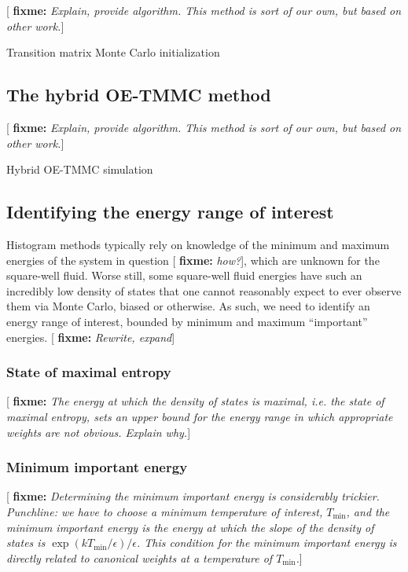 \documentclass[11pt]{article}
\renewcommand{\t}{\text} %
\newcommand{\p}[1]{\left(#1\right)} %
\newcommand{\red}[1]{{\bf \color{red} #1}}
\newcommand{\fixme}[1]{[\red{fixme:} \emph{#1}]}
\begin{document}
\fixme{Explain, provide algorithm. This method is sort of our own, but
  based on other work.}

\begin{algorithm}[H]
  \caption{Transition matrix Monte Carlo initialization}
  \label{alg:tmmc}
\end{algorithm}


\subsection{The hybrid OE-TMMC method}
\label{sec:oetmmc}

\fixme{Explain, provide algorithm. This method is sort of our own, but
  based on other work.}

\begin{algorithm}[H]
  \caption{Hybrid OE-TMMC simulation}
  \label{alg:oetmmc}
\end{algorithm}


\subsection{Identifying the energy range of interest}
\label{sec:energy_range}

Histogram methods typically rely on knowledge of the minimum and
maximum energies of the system in question \fixme{how?}, which are
unknown for the square-well fluid. Worse still, some square-well fluid
energies have such an incredibly low density of states that one cannot
reasonably expect to ever observe them via Monte Carlo, biased or
otherwise. As such, we need to identify an energy range of interest,
bounded by minimum and maximum ``important'' energies. \fixme{Rewrite,
  expand}

\subsubsection{State of maximal entropy}
\label{sec:max_entropy}

\fixme{The energy at which the density of states is maximal, i.e. the
  state of maximal entropy, sets an upper bound for the energy range
  in which appropriate weights are not obvious. Explain why.}

\subsubsection{Minimum important energy}
\label{sec:min_energy}

\fixme{Determining the minimum important energy is considerably
  trickier. Punchline: we have to choose a minimum temperature of
  interest, $T_{\t{min}}$, and the minimum important energy is the
  energy at which the slope of the density of states is
  $\exp\p{kT_{\t{min}}/\epsilon}/\epsilon$. This condition for the
  minimum important energy is directly related to canonical weights at
  a temperature of $T_{\t{min}}$.}
\end{document}
